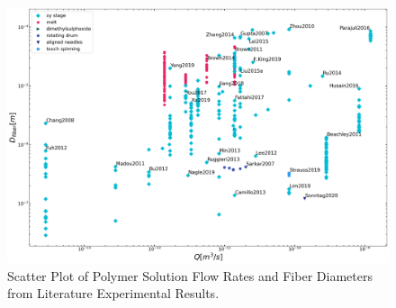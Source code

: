 \begin{figure}[!th]
\centering
\includegraphics[width=\textwidth]{./Figures/plt_Qm3s_vs_Dfiberm.png}
\decoRule
\caption[Scatter Plot of Polymer Solution Flow Rates and Fiber Diameters from Literature Experimental Results]{Scatter Plot of Polymer Solution Flow Rates and Fiber Diameters from Literature Experimental Results. \cite{
  Yang2019,Fattahi2017,Shin2019,Wang2015,Parajuli2016,Zheng2010,Fuh2011,Dalton2015,
  Ru2014,Xue2014,Wang2017,Xu2014,Liu2013,Pan2014,Canton2014,Chakraborty2009,Gupta2007,
  He2018,Zhou2011,Chen2013,Williams2018,Choi2017,Pan2019,Lei2015,Lim2019,Park2020,
  Fuh2012,Flores2017,Chang2010,Xu2019,Zhang2019,Shin2018,Fuh2015,Nagle2019,Zheng2012,
  Kameoka2003a,Liu2014,E.King2019,Hochleitner2017,Madou2011,Jiang2018,Husain2016,
  ElectrospinTech2015,Brown2011,Kolan2018,Chang2011,Beachley2011,Camillo2013,Kameoka2003,
  Bu2012,Lee2012,Huang2015,Coppola2020,CisquellaSerra2019,Ruggieri2013,Hochleitner2014,
  Zhu2016,Brown2014,Chang2008,Sonntag2020,Kim2018,Deng2020,Han2019,George2020,Sun2006a,
  Pan2015,Shen2016,Strauss2019,Fuh2013,Sarkar2007,You2017,Wang2018a,Zheng2014,Song2015,
  GaofengZheng2010,Liu2015a,Min2013,Luo2016,Yousefi2019,Cardenas2017,Coppola2014}}
\label{fig:plt_Qm3s_vs_Dfiberm}
\end{figure}

